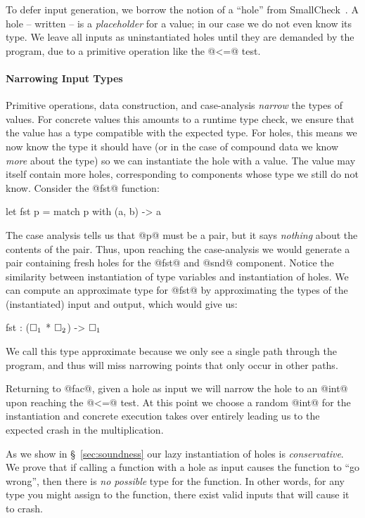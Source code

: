 To defer input generation, we borrow the notion of a ``hole'' from
SmallCheck~\cite{runciman_smallcheck_2008}.
%
A hole -- written \ehole{} -- is a \emph{placeholder} for a value; in
our case we do not even know its type.
%
We leave all inputs as uninstantiated holes until they are demanded by
the program, \eg due to a primitive operation like the @<=@ test.

\paragraph{Narrowing Input Types}
Primitive operations, data construction, and case-analysis \emph{narrow}
the types of values. 
%
For concrete values this amounts to a runtime type check, we ensure that
the value has a type compatible with the expected type.
%
For holes, this means we now know the type it should
have (or in the case of compound data we know \emph{more} about the
type) so we can instantiate the hole with a value.
%
The value may itself contain more holes, corresponding to components
whose type we still do not know.
%
Consider the @fst@ function:
%
\begin{code}
  let fst p = match p with
    (a, b) -> a
\end{code}
%
The case analysis tells us that @p@ must be a pair, but it says
\emph{nothing} about the contents of the pair.
%
Thus, upon reaching the case-analysis we would generate a pair
containing fresh holes for the @fst@ and @snd@ component. 
%
Notice the similarity between instantiation of type variables and
instantiation of holes.
%
We can compute an approximate type for @fst@ by approximating the types
of the (instantiated) input and output, which would give us:
%
\begin{mcode}
  fst : ($\square_{1}$ * $\square_{2}$) -> $\square_{1}$
\end{mcode}
%
We call this type approximate because we only see a single path through
the program, and thus will miss narrowing points that only occur in
other paths.

Returning to @fac@, given a hole as input we will narrow the hole
to an @int@ upon reaching the @<=@ test.
%
At this point we choose a random @int@ for the instantiation and
concrete execution takes over entirely leading us to the expected crash
in the multiplication.

As we show in \S~\ref{sec:soundness} our lazy instantiation of holes is
\emph{conservative}.
%
We prove that if calling a function with a hole as input causes the
function to ``go wrong'', then there is \emph{no possible} type for the
function.
%
In other words, for any type you might assign to the function, there
exist valid inputs that will cause it to crash.

